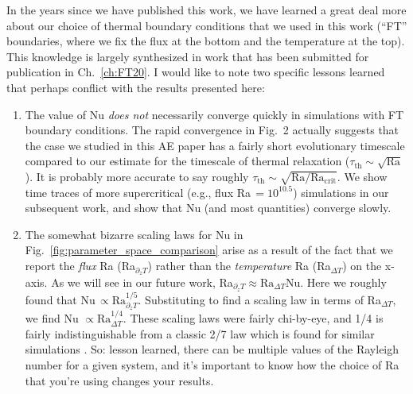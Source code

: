 In the years since we have published this work, we have learned a great deal more about our choice of thermal boundary conditions that we used in this work (``FT'' boundaries, where we fix the flux at the bottom and the temperature at the top).
This knowledge is largely synthesized in work that has been submitted for publication in Ch.~\ref{ch:FT20}.
I would like to note two specific lessons learned that perhaps conflict with the results presented here:
\begin{enumerate}
\item The value of Nu \emph{does not} necessarily converge quickly in simulations with FT boundary conditions.
The rapid convergence in Fig.~2 actually suggests that the case we studied in this AE paper has a fairly short evolutionary timescale compared to our estimate for the timescale of thermal relaxation ($\tau_{\text{th}} \sim \sqrt{\text{Ra}}$).
It is probably more accurate to say roughly $\tau_{\text{th}} \sim \sqrt{\text{Ra}/\text{Ra}_{\text{crit}}}$.
We show time traces of more supercritical (e.g., flux Ra$\,= 10^{10.5}$) simulations in our subsequent work, and show that Nu (and most quantities) converge slowly.
\item The somewhat bizarre scaling laws for Nu in Fig.~\ref{fig:parameter_space_comparison} arise as a result of the fact that we report the \emph{flux} Ra (Ra$_{\partial_z T}$) rather than the \emph{temperature} Ra (Ra$_{\Delta T}$) on the x-axis.
As we will see in our future work, Ra$_{\partial_z T} \approx \text{Ra}_{\Delta T} \text{Nu}$. 
Here we roughly found that Nu$\,\propto \text{Ra}_{\partial_z T}^{1/5}$.
Substituting to find a scaling law in terms of Ra$_{\Delta T}$, we find Nu $\propto \text{Ra}_{\Delta T}^{1/4}$.
These scaling laws were fairly chi-by-eye, and 1/4 is fairly indistinguishable from a classic 2/7 law which is found for similar simulations \citep{johnston&doering2009}.
So: lesson learned, there can be multiple values of the Rayleigh number for a given system, and it's important to know how the choice of Ra that you're using changes your results.
\end{enumerate}

